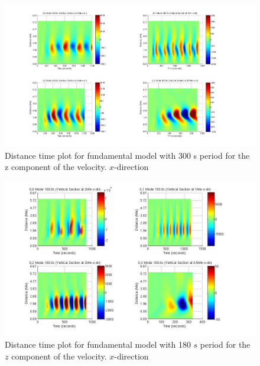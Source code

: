 \documentclass[authoryear,final,1p]{elsarticle}
\begin{document}

\begin{figure}[h]
\includegraphics[scale=0.3]{imagesn/dt_300_vert_x.jpg}
\caption{Distance time plot for fundamental model with 300 s period for the z component of the velocity. $x$-direction }
\label{Fig7}
\end{figure}


\begin{figure}[h]
\includegraphics[scale=0.45]{imagesn/dt_180_vert_x.jpg}
\caption{Distance time plot for fundamental model with 180 $s$ period for the $z$ component of the velocity.  $x$-direction}
\end{figure}
\end{document}
